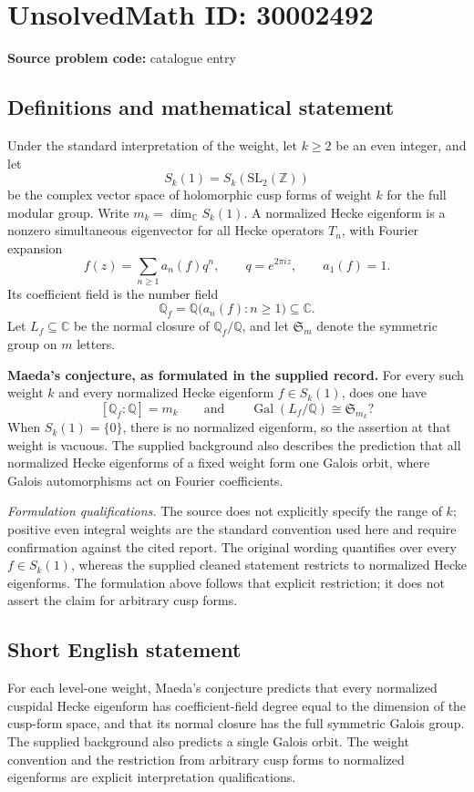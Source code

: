 \documentclass[11pt]{article}
\newcommand{\Z}{\mathbb{Z}}
\newcommand{\Q}{\mathbb{Q}}
\newcommand{\C}{\mathbb{C}}
\begin{document}
\section*{UnsolvedMath ID: 30002492}
\textbf{Source problem code:} catalogue entry
\subsection{Definitions and mathematical statement}
Under the standard interpretation of the weight, let \(k\geq 2\) be an even integer, and let
\[
S_k(1)=S_k(\mathrm{SL}_2(\Z))
\]
be the complex vector space of holomorphic cusp forms of weight \(k\) for the full modular group. Write \(m_k=\dim_{\C}S_k(1)\). A normalized Hecke eigenform is a nonzero simultaneous eigenvector for all Hecke operators \(T_n\), with Fourier expansion
\[
f(z)=\sum_{n\geq 1}a_n(f)q^n,\qquad q=e^{2\pi i z},\qquad a_1(f)=1.
\]
Its coefficient field is the number field
\[
\Q_f=\Q\bigl(a_n(f):n\geq 1\bigr)\subseteq\C.
\]
Let \(L_f\subseteq\C\) be the normal closure of \(\Q_f/\Q\), and let \(\mathfrak S_m\) denote the symmetric group on \(m\) letters.

\textbf{Maeda's conjecture, as formulated in the supplied record.} For every such weight \(k\) and every normalized Hecke eigenform \(f\in S_k(1)\), does one have
\[
[\Q_f:\Q]=m_k
\qquad\text{and}\qquad
\operatorname{Gal}(L_f/\Q)\cong\mathfrak S_{m_k}?
\]
When \(S_k(1)=\{0\}\), there is no normalized eigenform, so the assertion at that weight is vacuous. The supplied background also describes the prediction that all normalized Hecke eigenforms of a fixed weight form one Galois orbit, where Galois automorphisms act on Fourier coefficients.

\textit{Formulation qualifications.} The source does not explicitly specify the range of \(k\); positive even integral weights are the standard convention used here and require confirmation against the cited report. The original wording quantifies over every \(f\in S_k(1)\), whereas the supplied cleaned statement restricts to normalized Hecke eigenforms. The formulation above follows that explicit restriction; it does not assert the claim for arbitrary cusp forms.
\subsection{Short English statement}
For each level-one weight, Maeda's conjecture predicts that every normalized cuspidal Hecke eigenform has coefficient-field degree equal to the dimension of the cusp-form space, and that its normal closure has the full symmetric Galois group. The supplied background also predicts a single Galois orbit. The weight convention and the restriction from arbitrary cusp forms to normalized eigenforms are explicit interpretation qualifications.
\end{document}
